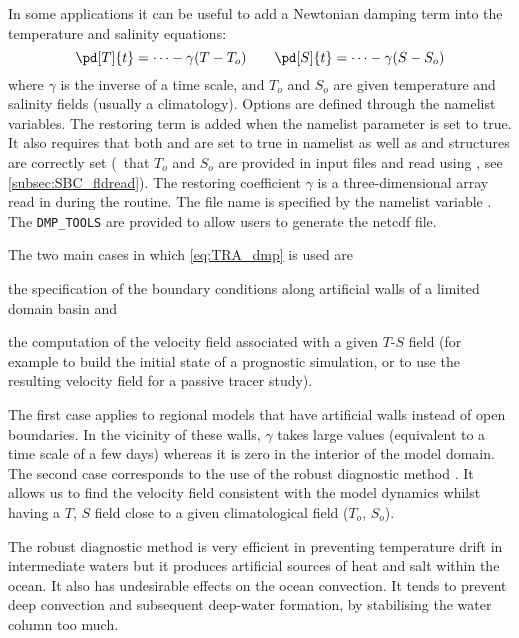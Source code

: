 \documentclass[../main/NEMO_manual]{subfiles}
\begin{document}
In some applications it can be useful to add a Newtonian damping term into
the temperature and salinity equations:
\begin{equation}
  \label{eq:TRA_dmp}
    \pd[T]{t} = \cdots - \gamma (T - T_o) \qquad \pd[S]{t} = \cdots - \gamma (S - S_o)
\end{equation}
where $\gamma$ is the inverse of a time scale,
and $T_o$ and $S_o$ are given temperature and salinity fields (usually a climatology).
Options are defined through the  namelist variables.
The restoring term is added when the namelist parameter  is set to true.
It also requires that both  and
 are set to true in  namelist as well as
 and  structures are correctly set
(\ie\ that $T_o$ and $S_o$ are provided in input files and read using ,
see \autoref{subsec:SBC_fldread}).
The restoring coefficient $\gamma$ is a three-dimensional array read in during
the  routine.
The file name is specified by the namelist variable .
The \texttt{DMP\_TOOLS} are provided to allow users to generate the netcdf file.

The two main cases in which \autoref{eq:TRA_dmp} is used are
\begin{enumerate*}[label=(\textit{\alph*})]
\item the specification of the boundary conditions along
  artificial walls of a limited domain basin and
\item the computation of the velocity field associated with a given $T$-$S$ field
  (for example to build the initial state of a prognostic simulation,
  or to use the resulting velocity field for a passive tracer study).
\end{enumerate*}
The first case applies to regional models that have artificial walls instead of open boundaries.
In the vicinity of these walls, $\gamma$ takes large values (equivalent to a time scale of a few days)
whereas it is zero in the interior of the model domain.
The second case corresponds to the use of the robust diagnostic method \citep{sarmiento.bryan_JGR82}.
It allows us to find the velocity field consistent with the model dynamics whilst
having a $T$, $S$ field close to a given climatological field ($T_o$, $S_o$).

The robust diagnostic method is very efficient in preventing temperature drift in
intermediate waters but it produces artificial sources of heat and salt within the ocean.
It also has undesirable effects on the ocean convection.
It tends to prevent deep convection and subsequent deep-water formation,
by stabilising the water column too much.
\end{document}
